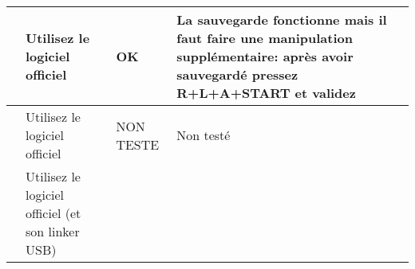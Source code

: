 \tablelasttail{\hline}
\begin{supertabular}{|p{3.5cm}|l|l|l|}
  \hline
      \begin{minipage}[c]{3cm}
      \vspace{0.5cm}
      \end{minipage} &
      \begin{minipage}{3cm}
      Utilisez le logiciel officiel
      \end{minipage} &
      \begin{minipage}{2cm}
      \textcolor{vert}{OK}
      \end{minipage} &
      \begin{minipage}{7cm}
      La sauvegarde fonctionne mais il faut faire une manipulation supplémentaire: après avoir sauvegardé {\bf pressez R+L+A+START et validez}
      \end{minipage} \\
  \hline
      \begin{minipage}[c]{3cm}
      \vspace{0.5cm}
      \end{minipage} &
      \begin{minipage}{3cm}
      Utilisez le logiciel officiel
      \end{minipage} &
      \begin{minipage}{2cm}
      \textcolor{bleu}{NON TESTE}
      \end{minipage} &
      \begin{minipage}{7cm}
      Non testé
      \end{minipage} \\
  \hline
      \begin{minipage}[c]{3cm}
      \vspace{0.5cm}
      \end{minipage} &
      \begin{minipage}{3cm}
      Utilisez le logiciel officiel (et son linker USB)

\end{minipage}
\end{supertabular}
